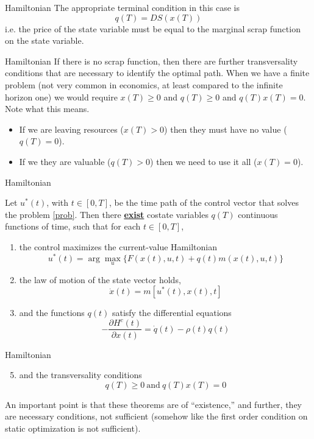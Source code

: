 \documentclass[aspectratio=169]{beamer}
\begin{document}
\begin{frame}{Hamiltonian}
    The appropriate terminal condition in this case is \[q(T)=DS(x(T))\] i.e. the price of the state variable must be equal to the marginal scrap function on the state variable.
    
\end{frame}

\begin{frame}{Hamiltonian}
    If there is no scrap function, then there are further transversality conditions that are necessary to identify the optimal path. When we have a finite problem (not very common in economics, at least compared to the infinite horizon one) we would require $x(T)\geq0$ and $q(T)\geq0$ and $q(T)x(T)=0$. Note what this means.
    \begin{itemize}
        \item If we are leaving resources ($x(T)>0$) then they must have no value ($q(T)=0$).
        \item If we they are valuable ($q(T)>0$) then we need to use it all ($x(T)=0$).
    \end{itemize} 
\end{frame}

\begin{frame}{Hamiltonian}
    \begin{theorem}
        Let $u^*(t)$, with $t\in[0,T]$, be the time path of the control vector that solves the problem \eqref{prob}. Then there \underline{\textbf{exist}} costate variables $q(T)$ continuous functions of time, such that for each $t\in[0,T]$,
        \begin{enumerate}
            \item the control maximizes the current-value Hamiltonian \[u^*(t)=\arg\max_{u}\{F(x(t),u,t)+q(t)m(x(t),u,t)\}\]
            \item the law of motion of the state vector holds, \[\dot{x}(t)=m[u^*(t),x(t),t]\]
            \item and the functions $q(t)$ satisfy the differential equations \[-\frac{\partial H^c(t)}{\partial x(t)}=\dot{q}(t)-\rho(t)q(t)\]
        \end{enumerate}
    \end{theorem}
\end{frame}

\begin{frame}{Hamiltonian}
    \begin{enumerate}
        \setcounter{enumi}{4}
        \item and the transversality conditions \[q(T)\geq 0 \ \text{and}\ q(T)x(T)=0\]
    \end{enumerate}
    
    An important point is that these theorems are of ``existence,'' and further, they are necessary conditions, not sufficient (somehow like the first order condition on static optimization is not sufficient).
\end{frame}
\end{document}
